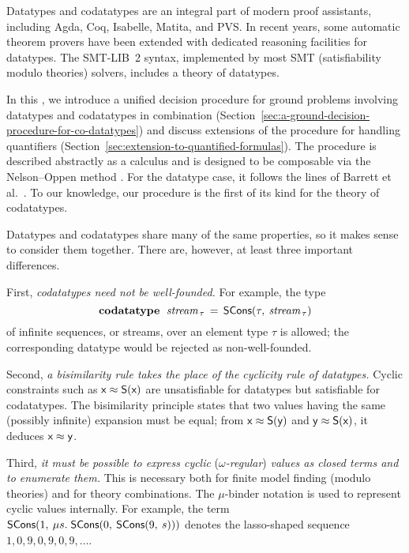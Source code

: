 \nopagebreak

Datatypes and codatatypes are an integral part of modern proof assistants,
including Agda, Coq, Isabelle, Matita, and PVS. In recent years, some
automatic theorem provers have been extended with dedicated reasoning facilities
for datatypes. The SMT-LIB~2 \cite{barrett-et-al-2010} syntax, implemented by
most SMT (satisfiability modulo theories) solvers, includes a theory of
datatypes.

In this \thewordpaper, we introduce a unified decision procedure for ground
problems involving datatypes and codatatypes in combination
(Section~\ref{sec:a-ground-decision-procedure-for-co-datatypes})
and discuss extensions  of the procedure for handling quantifiers
(Section~\ref{sec:extension-to-quantified-formulas}).
The procedure is described abstractly as a calculus and is
designed to be composable via the Nelson--Oppen method \cite{nelson-oppen-1979}.
For the datatype case, it follows the lines of Barrett et al.\ \cite{barrett-et-al-2007}.
To our knowledge, our procedure is the first of its kind for the theory of
codatatypes. 

Datatypes and codatatypes share many of the same properties, so it makes sense
to consider them together. There are, however, at least three important
differences.

First, \emph{codatatypes need not be well-founded.}
For example, the type
%
\[\textbf{codatatype}~\;\textit{stream}_{\,\tau} \,=\, \textsf{SCons}(\tau,\: \textit{stream}_{\,\tau})\]
%
of infinite sequences, or streams, over an element type $\tau$ is allowed; the
corresponding datatype would be rejected as non-well-founded.

Second, \emph{a bisimilarity rule takes the place of the cyclicity rule of datatypes.}
Cyclic constraints such as
$\textsf{x} \approx \textsf{S}(\textsf{x})$ %
are unsatisfiable for datatypes but satisfiable for codatatypes.
The bisimilarity principle states that two values having the same (possibly
infinite) expansion must be equal; from $\textsf{x} \approx \textsf{S}(\textsf{y})$ and
$\textsf{y} \approx \textsf{S}(\textsf{x})$, it deduces $\textsf{x} \approx \textsf{y}$.

Third, \emph{it must be possible to express cyclic }(\emph{$\omega$-regular}) \emph{values as closed terms and
to enumerate them.} This is necessary both for finite model finding (modulo theories)
and for theory combinations. The $\mu$-binder notation is used to represent cyclic
values internally. For example,
the term $\textsf{SCons}(1,\: \mu s.\; \textsf{SCons}(0,\: \textsf{SCons}(9,\: s)))$
denotes the lasso-shaped sequence $1, 0, 9, 0, 9, 0, 9, \ldots$\afterLdots.

